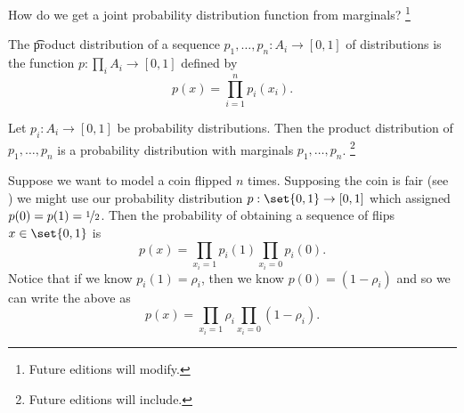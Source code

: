 

How do we get a joint probability distribution function from marginals?
  \ifhmode\unskip\fi\footnote{
Future editions will modify.
  }


The \t{product distribution} of a sequence $p_1, \dots, p_n: A_i \to [0, 1]$ of distributions is the function $p: \prod_{i} A_i \to [0, 1]$ defined by
  \[
p(x) = \prod_{i = 1}^{n} p_i(x_i).
  \]

\begin{proposition}
Let $p_i: A_i \to [0, 1]$ be probability distributions.
Then the product distribution of $p_1, \dots, p_n$ is a probability distribution with marginals $p_1, \dots, p_n$.
  \ifhmode\unskip\fi\footnote{
Future editions will include.
  }
\end{proposition}


Suppose we want to model a coin flipped $n$ times.
Supposing the coin is fair (see ) we might use our probability distribution $p: \set{0, 1} \to [0, 1]$ which assigned $p(0) = p(1) = \nicefrac{1}{2}$.
Then the probability of obtaining a sequence of flips $x \in \set{0, 1}$ is
  \[
\textstyle
p(x) = \prod_{x_i = 1} p_i(1) \prod_{x_i = 0} p_i(0).
  \]
Notice that if we know $p_i(1) = \rho _i$, then we know $p(0) = (1-\rho _i)$ and so we can write the above as
  \[
\textstyle
p(x) = \prod_{x_i = 1} \rho _i \prod_{x_i = 0} (1-\rho _i).
  \]
